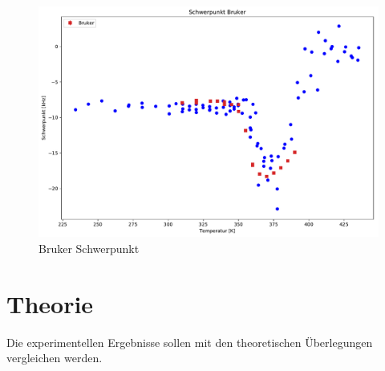 \begin{figure}
	\begin{center}
		\includegraphics[width=\textwidth]{graphics/plots/BRUKER/bruker_mean.pdf} 
	\end{center}
	\caption{Bruker Schwerpunkt} \label{fig:res:bruker_mean}
\end{figure}



















\section{Theorie} \label{section:res:theorie}

Die experimentellen Ergebnisse sollen mit den theoretischen Überlegungen vergleichen werden.

